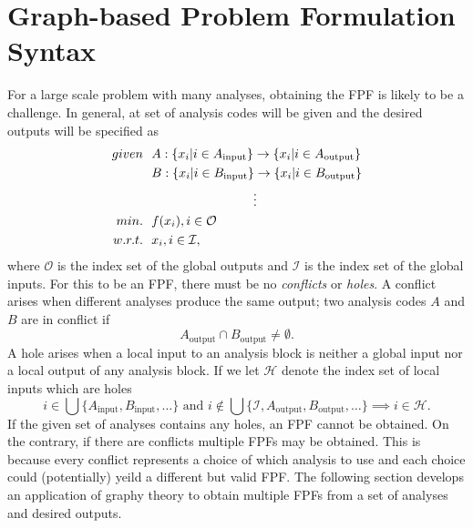 \section{Graph-based Problem Formulation Syntax}
	For a large scale problem with many analyses, obtaining the FPF is likely to be a challenge. In general, at set of analysis codes will be given and the desired outputs will be specified as
	    \begin{align}
            given & \ \ A: \lbrace x_i \lvert i \in A_\textrm{input} \rbrace \rightarrow \lbrace x_i \lvert i \in A_\textrm{output} \rbrace \notag
            \\    & \ \ B: \lbrace x_i \lvert i \in B_\textrm{input} \rbrace \rightarrow \lbrace x_i \lvert i \in B_\textrm{output} \rbrace \notag
			\\    & \ \ \quad \quad \quad \quad \quad \quad  \quad \quad \vdots
            \\min. &\ \ f(x_i), i \in \mathcal{O} \notag
            \\w.r.t. & \ \ x_i, i \in \mathcal{I}, \notag
            \label{eqn:preFPF}
        \end{align}
	where $\mathcal{O}$ is the index set of the global outputs and $\mathcal{I}$ is the index set of the global inputs. For this to be an FPF, there must be no \emph{conflicts} or \emph{holes}. A conflict arises when different analyses produce the same output; two analysis codes $A$ and $B$ are in conflict if
		\begin{equation}
			A_\textrm{output} \cap B_\textrm{output} \neq \emptyset.
		\end{equation}
	A hole arises when a local input to an analysis block is neither a global input nor a local output of any analysis block. If we let $\mathcal{H}$ denote the index set of local inputs which are holes
		\begin{equation}
			i \in \bigcup \{A_\textrm{input},B_\textrm{input},\ldots\} \textrm{ and } i \notin \bigcup \{\mathcal{I},A_\textrm{output},B_\textrm{output},\ldots\}  \implies  i \in \mathcal{H}.
		\end{equation}
	If the given set of analyses contains any holes, an FPF cannot be obtained. On the contrary, if there are conflicts multiple FPFs may be obtained. This is because every conflict represents a choice of which analysis to use and each choice could (potentially) yeild a different but valid FPF. The following section develops an application of graphy theory to obtain multiple FPFs from a set of analyses and desired outputs.
		
